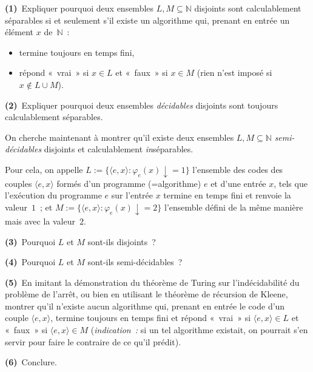 \documentclass[12pt,a4paper]{article}
\theoremstyle{definition}
\begin{document}
\textbf{(1)} Expliquer pourquoi deux ensembles $L,M \subseteq
\mathbb{N}$ disjoints sont calculablement séparables si et seulement
s'il existe un algorithme qui, prenant en entrée un élément $x$
de $\mathbb{N}$ :
\begin{itemize}
\item termine toujours en temps fini,
\item répond « vrai » si $x\in L$ et « faux » si $x \in M$ (rien n'est
  imposé si $x\not\in L\cup M$).
\end{itemize}

\textbf{(2)} Expliquer pourquoi deux ensembles \emph{décidables}
disjoints sont toujours calculablement séparables.

On cherche maintenant à montrer qu'il existe deux ensembles $L,M
\subseteq \mathbb{N}$ \emph{semi-décidables} disjoints et
calculablement \emph{in}séparables.

Pour cela, on appelle $L := \{\langle e,x\rangle :
\varphi_e(x){\downarrow} = 1\}$ l'ensemble des codes des couples
$\langle e,x\rangle$ formés d'un programme (=algorithme) $e$ et d'une
entrée $x$, tels que l'exécution du programme $e$ sur l'entrée $x$
termine en temps fini et renvoie la valeur $1$ ; et $M := \{\langle
e,x\rangle : \varphi_e(x){\downarrow} = 2\}$ l'ensemble défini de la
même manière mais avec la valeur $2$.

\textbf{(3)} Pourquoi $L$ et $M$ sont-ils disjoints ?

\textbf{(4)} Pourquoi $L$ et $M$ sont-ils semi-décidables ?

\textbf{(5)} En imitant la démonstration du théorème de Turing sur
l'indécidabilité du problème de l'arrêt, ou bien en utilisant le
théorème de récursion de Kleene, montrer qu'il n'existe aucun
algorithme qui, prenant en entrée le code d'un couple $\langle
e,x\rangle$, termine toujours en temps fini et répond « vrai » si
$\langle e,x\rangle\in L$ et « faux » si $\langle e,x\rangle \in M$
(\emph{indication :} si un tel algorithme existait, on pourrait s'en
servir pour faire le contraire de ce qu'il prédit).

\textbf{(6)} Conclure.
\end{document}
